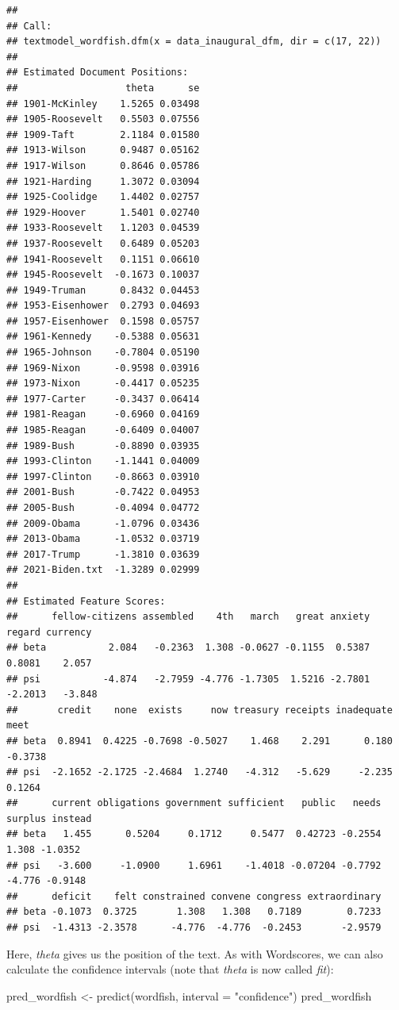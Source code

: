 \documentclass[
]{book}
\newenvironment{Shaded}{\begin{snugshade}}{\end{snugshade}}
\newcommand{\AttributeTok}[1]{\textcolor[rgb]{0.77,0.63,0.00}{#1}}
\newcommand{\FunctionTok}[1]{\textcolor[rgb]{0.00,0.00,0.00}{#1}}
\newcommand{\NormalTok}[1]{#1}
\newcommand{\OtherTok}[1]{\textcolor[rgb]{0.56,0.35,0.01}{#1}}
\newcommand{\StringTok}[1]{\textcolor[rgb]{0.31,0.60,0.02}{#1}}
\begin{document}
\begin{verbatim}
## 
## Call:
## textmodel_wordfish.dfm(x = data_inaugural_dfm, dir = c(17, 22))
## 
## Estimated Document Positions:
##                   theta      se
## 1901-McKinley    1.5265 0.03498
## 1905-Roosevelt   0.5503 0.07556
## 1909-Taft        2.1184 0.01580
## 1913-Wilson      0.9487 0.05162
## 1917-Wilson      0.8646 0.05786
## 1921-Harding     1.3072 0.03094
## 1925-Coolidge    1.4402 0.02757
## 1929-Hoover      1.5401 0.02740
## 1933-Roosevelt   1.1203 0.04539
## 1937-Roosevelt   0.6489 0.05203
## 1941-Roosevelt   0.1151 0.06610
## 1945-Roosevelt  -0.1673 0.10037
## 1949-Truman      0.8432 0.04453
## 1953-Eisenhower  0.2793 0.04693
## 1957-Eisenhower  0.1598 0.05757
## 1961-Kennedy    -0.5388 0.05631
## 1965-Johnson    -0.7804 0.05190
## 1969-Nixon      -0.9598 0.03916
## 1973-Nixon      -0.4417 0.05235
## 1977-Carter     -0.3437 0.06414
## 1981-Reagan     -0.6960 0.04169
## 1985-Reagan     -0.6409 0.04007
## 1989-Bush       -0.8890 0.03935
## 1993-Clinton    -1.1441 0.04009
## 1997-Clinton    -0.8663 0.03910
## 2001-Bush       -0.7422 0.04953
## 2005-Bush       -0.4094 0.04772
## 2009-Obama      -1.0796 0.03436
## 2013-Obama      -1.0532 0.03719
## 2017-Trump      -1.3810 0.03639
## 2021-Biden.txt  -1.3289 0.02999
## 
## Estimated Feature Scores:
##      fellow-citizens assembled    4th   march   great anxiety  regard currency
## beta           2.084   -0.2363  1.308 -0.0627 -0.1155  0.5387  0.8081    2.057
## psi           -4.874   -2.7959 -4.776 -1.7305  1.5216 -2.7801 -2.2013   -3.848
##       credit    none  exists     now treasury receipts inadequate    meet
## beta  0.8941  0.4225 -0.7698 -0.5027    1.468    2.291      0.180 -0.3738
## psi  -2.1652 -2.1725 -2.4684  1.2740   -4.312   -5.629     -2.235  0.1264
##      current obligations government sufficient   public   needs surplus instead
## beta   1.455      0.5204     0.1712     0.5477  0.42723 -0.2554   1.308 -1.0352
## psi   -3.600     -1.0900     1.6961    -1.4018 -0.07204 -0.7792  -4.776 -0.9148
##      deficit    felt constrained convene congress extraordinary
## beta -0.1073  0.3725       1.308   1.308   0.7189        0.7233
## psi  -1.4313 -2.3578      -4.776  -4.776  -0.2453       -2.9579
\end{verbatim}

Here, \emph{theta} gives us the position of the text. As with Wordscores, we can also calculate the confidence intervals (note that \emph{theta} is now called \emph{fit}):

\begin{Shaded}
\begin{Highlighting}[]
\NormalTok{pred\_wordfish }\OtherTok{\textless{}{-}} \FunctionTok{predict}\NormalTok{(wordfish, }\AttributeTok{interval =} \StringTok{"confidence"}\NormalTok{)}
\NormalTok{pred\_wordfish}
\end{Highlighting}
\end{Shaded}
\end{document}
